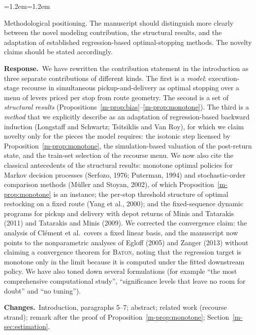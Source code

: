 \documentclass[11pt]{article}
\newenvironment{comment}{\par\medskip\noindent\color{rev}\itshape
  \begin{list}{}{\leftmargin=1.2em\rightmargin=1.2em}\item[]}%
  {\end{list}\par}
\newcommand{\resp}{\par\noindent\textbf{Response.}\ }
\newcommand{\chg}{\par\noindent\textbf{Changes.}\ }
\newcommand{\sref}[1]{Section~\ref{m-#1}}
\newcommand{\BATON}{\textsc{Baton}}
\begin{document}
\begin{comment}
Methodological positioning. The manuscript should distinguish more
clearly between the novel modeling contribution, the structural
results, and the adaptation of established regression-based
optimal-stopping methods. The novelty claims should be stated
accordingly.
\end{comment}
\resp We have rewritten the contribution statement in the introduction
as three separate contributions of different kinds. The first is a
\emph{model}: execution-stage recourse in simultaneous
pickup-and-delivery as optimal stopping over a menu of levers priced per
stop from route geometry. The second is a set of \emph{structural
results} (Propositions~\ref{m-prop:bias}--\ref{m-prop:monotone}). The
third is a \emph{method} that we explicitly describe as an adaptation of
regression-based backward induction (Longstaff and Schwartz; Tsitsiklis
and Van Roy), for which we claim novelty only for the pieces the model
requires: the isotonic step licensed by
Proposition~\ref{m-prop:monotone}, the simulation-based valuation of
the post-return state, and the train-set selection of the recourse menu.
We now also cite the classical antecedents of the structural results:
monotone optimal policies for Markov decision processes (Serfozo, 1976;
Puterman, 1994) and stochastic-order comparison methods (M\"uller and
Stoyan, 2002), of which Proposition~\ref{m-prop:monotone} is an
instance; the per-stop threshold structure of optimal restocking on a
fixed route (Yang et al., 2000); and the fixed-sequence dynamic programs
for pickup and delivery with depot returns of Minis and Tatarakis (2011)
and Tatarakis and Minis (2009). We corrected the convergence claim: the
analysis of Cl\'ement et al.\ covers a fixed linear basis, and the
manuscript now points to the nonparametric analyses of Egloff (2005) and
Zanger (2013) without claiming a convergence theorem for \BATON, noting
that the regression target is monotone only in the limit because it is
computed under the fitted downstream policy. We have also toned down
several formulations (for example ``the most comprehensive computational
study'', ``significance levels that leave no room for doubt'' and
``no tuning'').
\chg Introduction, paragraphs 5--7; abstract; related work (recourse
strand); remark after the proof of Proposition~\ref{m-prop:monotone};
\sref{sec:estimation}.
\end{document}
